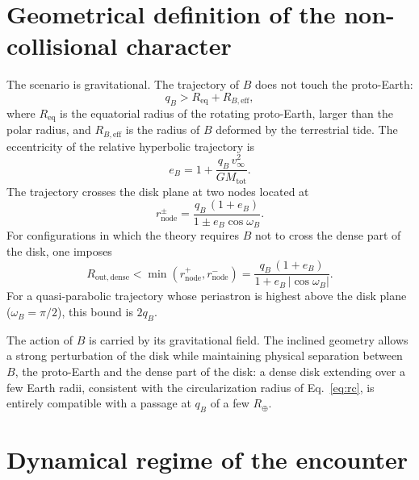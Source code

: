\documentclass[11pt,a4paper,openany]{report}
\newcommand{\Rt}{R_{\oplus}}
\newcommand{\Req}{R_{\mathrm{eq}}}
\newcommand{\Mtot}{M_{\mathrm{tot}}}
\begin{document}
\section{Geometrical definition of the non-collisional character}

The scenario is gravitational. The trajectory of $B$ does not touch the proto-Earth:
\begin{equation}
q_B>\Req+R_{B,\mathrm{eff}},
\label{eq:nc}
\end{equation}
where $\Req$ is the equatorial radius of the rotating proto-Earth, larger than the polar radius,
and $R_{B,\mathrm{eff}}$ is the radius of $B$ deformed by the terrestrial tide. The eccentricity of
the relative hyperbolic trajectory is
\begin{equation}
e_B=1+\frac{q_B\,v_\infty^2}{G\Mtot}.
\label{eq:eB}
\end{equation}
The trajectory crosses the disk plane at two nodes located at
\begin{equation}
r_{\text{node}}^{\pm}=\frac{q_B\,(1+e_B)}{1\pm e_B\cos\omega_B}.
\label{eq:noeuds}
\end{equation}
For configurations in which the theory requires $B$ not to cross the dense part of the disk, one
imposes
\begin{equation}
R_{\mathrm{out,dense}}<\min\left(r_{\text{node}}^{+},r_{\text{node}}^{-}\right)
=\frac{q_B\,(1+e_B)}{1+e_B\,|\cos\omega_B|}.
\label{eq:nontraversee}
\end{equation}
For a quasi-parabolic trajectory whose periastron is highest above the disk plane
($\omega_B=\pi/2$), this bound is $2q_B$.

\begin{lecture}
The action of $B$ is carried by its gravitational field. The inclined geometry allows a strong
perturbation of the disk while maintaining physical separation between $B$, the proto-Earth and
the dense part of the disk: a dense disk extending over a few Earth radii, consistent with the
circularization radius of Eq.~\eqref{eq:rc}, is entirely compatible with a passage at $q_B$ of a
few $\Rt$.
\end{lecture}

\section{Dynamical regime of the encounter}
\end{document}

